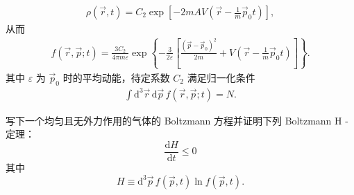 \documentclass{assignment}
\begin{document}
\begin{sol}
\begin{align}
        \rho(\vec{r},t)=C_2\exp\left[-2mAV\left(\vec{r}-\frac{1}{m}\vec{p}_0t\right)\right],
    \end{align}
    从而
    \begin{align}
        f(\vec{r},\vec{p};t)=\frac{3C_2}{4\pi m\varepsilon}\exp\left\{-\frac{3}{2\varepsilon}\left[\frac{(\vec{p}-\vec{p}_0)^2}{2m}+V\left(\vec{r}-\frac{1}{m}\vec{p}_0t\right)\right]\right\}.
    \end{align}
    其中 $\varepsilon$ 为 $\vec{p}_0$ 时的平均动能，待定系数 $C_2$ 满足归一化条件
    \begin{align}
        \int\mathrm{d}^3\vec{r}\,\mathrm{d}\vec{p}\,f(\vec{r},\vec{p};t)=N.
    \end{align}
\end{sol}

\begin{prob}
    写下一个均匀且无外力作用的气体的 Boltzmann 方程并证明下列 Boltzmann H - 定理：
    \[
        \frac{\mathrm{d}H}{\mathrm{d}t}\leq 0
    \]
    其中
    \[
        H\equiv\mathrm{d}^3\vec{p}\,f(\vec{p},t)\ln f(\vec{p},t).
    \]
\end{prob}
\begin{pf}
    
\end{pf}
\end{document}
